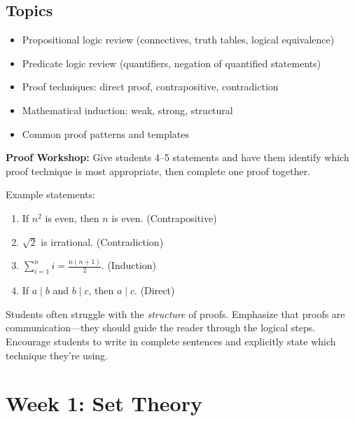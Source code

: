 \documentclass[11pt]{article}
\begin{document}
\subsection{Topics}
\begin{itemize}
    \item Propositional logic review (connectives, truth tables, logical equivalence)
    \item Predicate logic review (quantifiers, negation of quantified statements)
    \item Proof techniques: direct proof, contrapositive, contradiction
    \item Mathematical induction: weak, strong, structural
    \item Common proof patterns and templates
\end{itemize}

\begin{activitybox}
\textbf{Proof Workshop:} Give students 4--5 statements and have them identify which proof technique is most appropriate, then complete one proof together.

Example statements:
\begin{enumerate}
    \item If $n^2$ is even, then $n$ is even. (Contrapositive)
    \item $\sqrt{2}$ is irrational. (Contradiction)
    \item $\sum_{i=1}^{n} i = \frac{n(n+1)}{2}$. (Induction)
    \item If $a \mid b$ and $b \mid c$, then $a \mid c$. (Direct)
\end{enumerate}
\end{activitybox}

\begin{tipbox}
Students often struggle with the \textit{structure} of proofs. Emphasize that proofs are communication---they should guide the reader through the logical steps. Encourage students to write in complete sentences and explicitly state which technique they're using.
\end{tipbox}

\newpage
\section{Week 1: Set Theory}
\end{document}
